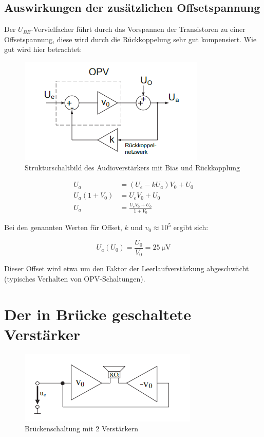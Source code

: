 \subsection{Auswirkungen der zusätzlichen Offsetspannung}

Der $U_{BE}$-Vervielfacher führt durch das Vorspannen der Transistoren zu einer Offsetspannung, diese wird durch die Rückkoppelung sehr gut kompensiert. Wie gut wird hier betrachtet:

\begin{figure}[H]
    \centering
    \includegraphics{tex/7_Leistungsverstaerker/pictures/Flowchart_audioamp.png}
    \caption{Strukturschaltbild des Audioverstärkers mit Bias und Rückkopplung}
    \label{fig:my_label}
\end{figure}

\begin{align}
    U_a &= \left( U_e - k U_a \right) V_0 + U_0 \\
    U_a (1 + V_0) &= U_e V_0 + U_0 \\
    U_a &= \frac{U_e V_0 + U_0}{1 + V_0}
\end{align}

Bei den genannten Werten für Offset, $k$ und $v_0 \approx 10^5$ ergibt sich:

\begin{equation}
    U_a(U_0) = \frac{U_0}{V_0} = \SI{25}{\micro \volt}
\end{equation}

Dieser Offset wird etwa um den Faktor der Leerlaufverstärkung abgeschwächt (typisches Verhalten von OPV-Schaltungen).

\section{Der in Brücke geschaltete Verstärker}

\begin{figure}[H]
    \centering
    \includegraphics{tex/7_Leistungsverstaerker/pictures/Bridgeamp.png}
    \caption{Brückenschaltung mit 2 Verstärkern}
    \label{fig:my_label}
\end{figure}

